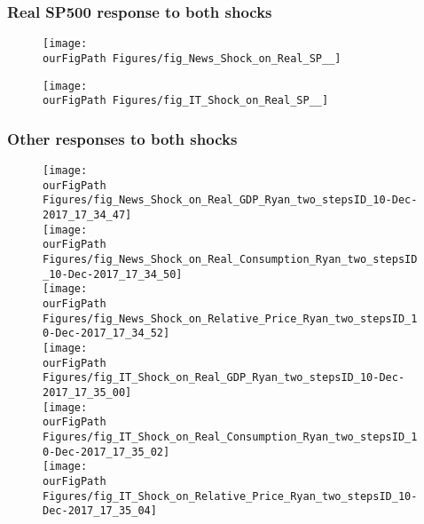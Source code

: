 \documentclass{beamer}
\def \ourFigPath {../../}
\begin{document}
\begin{frame}
\frametitle{Real SP500 response to both shocks}
\begin{figure}
	\centering
	\texttt{[image: \\ourFigPath Figures/fig\_News\_Shock\_on\_Real\_SP\_\_]}
\end{figure}
\begin{figure}
	\centering
	\texttt{[image: \\ourFigPath Figures/fig\_IT\_Shock\_on\_Real\_SP\_\_]}
\end{figure}
\end{frame}

\begin{frame}
\frametitle{Other responses to both shocks}

\vspace{-0.2cm}
\begin{figure}
\begin{multicols}{2}
\centering 
\texttt{[image: \\ourFigPath Figures/fig\_News\_Shock\_on\_Real\_GDP\_Ryan\_two\_stepsID\_10-Dec-2017\_17\_34\_47]}\\ 
\vspace{0.3cm}
\texttt{[image: \\ourFigPath Figures/fig\_News\_Shock\_on\_Real\_Consumption\_Ryan\_two\_stepsID\_10-Dec-2017\_17\_34\_50]}\\ 
\vspace{0.3cm}
\texttt{[image: \\ourFigPath Figures/fig\_News\_Shock\_on\_Relative\_Price\_Ryan\_two\_stepsID\_10-Dec-2017\_17\_34\_52]}\\ 


\texttt{[image: \\ourFigPath Figures/fig\_IT\_Shock\_on\_Real\_GDP\_Ryan\_two\_stepsID\_10-Dec-2017\_17\_35\_00]}\\
\vspace{0.3cm}
\texttt{[image: \\ourFigPath Figures/fig\_IT\_Shock\_on\_Real\_Consumption\_Ryan\_two\_stepsID\_10-Dec-2017\_17\_35\_02]}\\ 
\vspace{0.3cm}
\texttt{[image: \\ourFigPath Figures/fig\_IT\_Shock\_on\_Relative\_Price\_Ryan\_two\_stepsID\_10-Dec-2017\_17\_35\_04]}\\ 

\end{multicols}
\end{figure}


\end{frame}
\end{document}
